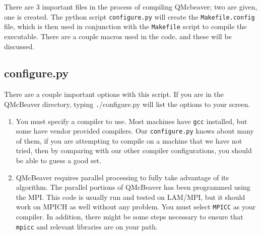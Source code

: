 \documentclass[11pt]{article}
\begin{document}
There are 3 important files in the process of compiling QMcbeaver; two are given, one is created. The python script
\texttt{configure.py} will create the \texttt{Makefile.config} file, which is then used in conjunction with the \texttt{Makefile} script to compile the executable. There are a couple macros used in the code, and these will be discussed.

\subsection{configure.py}
There are a couple important options with this script. If you are in the QMcBeaver directory, typing {\texttt./configure.py} will list the options to your screen.
\begin{enumerate}
\item You must specify a compiler to use. Most machines have \texttt{gcc} installed, but some have vendor provided compilers. Our \texttt{configure.py} knows about many of them, if you are attempting to compile on a machine that we have not tried, then by comparing with our other compiler configurations, you should be able to guess a good set.

\item QMcBeaver requires parallel processing to fully take advantage of its algorithm. The parallel portions of QMcBeaver has been programmed using the MPI. This code is usually run and tested on LAM/MPI, but it should work on MPICH as well without any problem. You must select \texttt{MPICC} as your compiler. In addition, there might be some steps necessary to ensure that \texttt{mpicc} and relevant libraries are on your path.


\end{enumerate}
\end{document}
